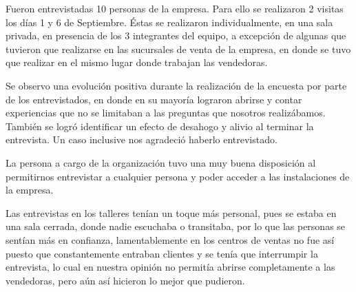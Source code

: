 
Fueron entrevistadas 10 personas de la empresa. Para ello se realizaron 2
visitas los días 1 y 6 de Septiembre. Éstas se realizaron individualmente, en
una sala privada, en presencia de los 3 integrantes del equipo, a excepción de
algunas que tuvieron que realizarse en las sucursales de venta de la empresa,
en donde se tuvo que realizar en el mismo lugar donde trabajan las vendedoras.

Se observo una evolución positiva durante la realización de la encuesta por
parte de los entrevistados, en donde en su mayoría lograron abrirse y contar
experiencias que no se limitaban a las preguntas que nosotros realizábamos.
También se logró identificar un efecto de desahogo y alivio al terminar la
entrevista. Un caso inclusive nos agradeció haberlo entrevistado.

La persona a cargo de la organización tuvo una muy buena disposición al permitirnos
entrevistar a cualquier persona y poder acceder a las instalaciones de la empresa.

Las entrevistas en los talleres tenían un toque más personal, pues se estaba en una
sala cerrada, donde nadie escuchaba o transitaba, por lo que las personas se sentían más
en confianza, lamentablemente en los centros de ventas no fue así puesto que constantemente
entraban clientes y se tenía que interrumpir la entrevista, lo cual en nuestra opinión
no permitía abrirse completamente a las vendedoras, pero aún así hicieron lo mejor que pudieron.
